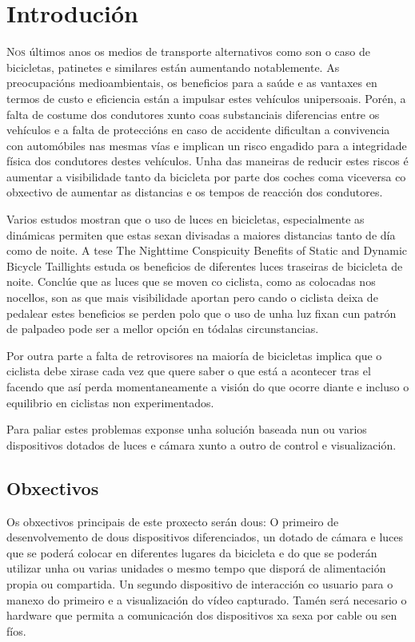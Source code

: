 \chapter{Introdución}
\label{chap:introducion}

\lettrine{N}{os} últimos anos os medios de transporte alternativos como son o caso de bicicletas, patinetes e similares están aumentando notablemente. As preocupacións medioambientais, os beneficios para a saúde e as vantaxes en termos de custo e eficiencia están a impulsar estes vehículos unipersoais. Porén, a falta de costume dos condutores xunto coas substanciais diferencias entre os vehículos e a falta de proteccións en caso de accidente dificultan a convivencia con automóbiles nas mesmas vías e implican un risco engadido para a integridade física dos condutores destes vehículos. Unha das maneiras de reducir estes riscos é aumentar a visibilidade tanto da bicicleta por parte dos coches coma viceversa co obxectivo de aumentar as distancias e os tempos de reacción dos condutores.

Varios estudos mostran que o uso de luces en bicicletas, especialmente as dinámicas permiten que estas sexan divisadas a maiores distancias tanto de día como de noite. A tese The Nighttime Conspicuity Benefits of Static and Dynamic Bicycle Taillights estuda os beneficios de diferentes luces traseiras de bicicleta de noite. Conclúe que as luces que se moven co ciclista, como as colocadas nos nocellos, son as que mais visibilidade aportan pero cando o ciclista  deixa de pedalear estes beneficios se perden polo que o uso de unha luz fixan cun patrón de palpadeo pode ser a mellor opción en tódalas circunstancias.

Por outra parte a falta de retrovisores na maioría de bicicletas implica que o ciclista debe xirase cada vez que quere saber o que está a acontecer tras el facendo que así perda momentaneamente a visión do que ocorre diante e incluso o equilibrio en ciclistas non experimentados.

Para paliar estes problemas exponse unha solución baseada nun ou varios dispositivos dotados de luces e cámara xunto a outro de control e visualización.


\section{Obxectivos}
\label{sec:obxectivos}
Os obxectivos principais de este proxecto serán dous:
O primeiro de desenvolvemento de dous dispositivos diferenciados, un dotado de cámara e luces que se poderá colocar en diferentes lugares da bicicleta e do que se poderán utilizar unha ou varias unidades o mesmo tempo que disporá de alimentación propia ou compartida. Un segundo dispositivo de interacción co usuario para o manexo do primeiro e a visualización do vídeo capturado. Tamén será necesario o hardware que permita a comunicación dos dispositivos xa sexa por cable ou sen fíos.

